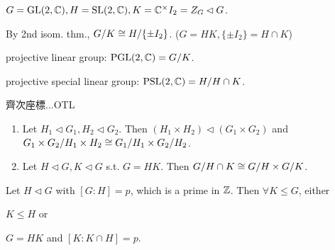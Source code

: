 \begin{example}
  $G = \text{GL}(2, \mathbb{C}), H = \text{SL}(2, \mathbb{C}), K = \mathbb{C}^\times I_2 = Z_G \lhd G$.

  By 2nd isom. thm., ${G}/{K} \cong {H}/{\{\pm I_2\}}$.
  ($G = HK, \{\pm I_2 \} = H \cap K$)

  projective linear group: $\text{PGL}(2, \mathbb{C}) = {G}/{K}$.

  projective special linear group: $\text{PSL}(2, \mathbb{C}) = {H}/{H\cap K}$.
\end{example}

齊次座標...OTL

\begin{exercise} \mbox{}
  \begin{enumerate}
    \item Let $H_1 \lhd G_1, H_2 \lhd G_2$. Then $(H_1 \times H_2) \lhd
      (G_1 \times G_2)$ and ${G_1\times G_2}/{H_1\times H_2} \cong
      {G_1}/{H_1} \times {G_2}/{H_2}$.
    \item Let $H \lhd G, K \lhd G$ s.t. $G = HK$. Then
      ${G}/{H\cap K} \cong {G}/{H} \times {G}/{K}$.
  \end{enumerate}
\end{exercise}

\begin{exercise}
  Let $H \lhd G$ with $[G:H] = p$, which is a prime in $\mathbb{Z}$. Then
  $\forall K \le G$, either \begin{enumerate*}[(1)]
    \item $K \le H$ or
    \item $G = HK$ and $[K:K\cap H] = p$.
  \end{enumerate*}
\end{exercise}

